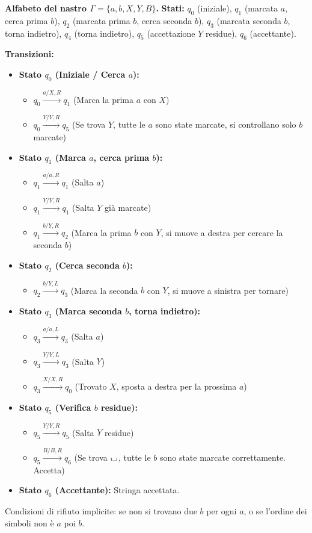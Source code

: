 \documentclass[a4paper]{article}
\theoremstyle{definition} %
\newcommand{\blankS}{\ensuremath{\raisebox{-0.15ex}{\scalebox{1.3}[0.7]{$\sqcup$}}}}
\begin{document}
\noindent \textbf{Alfabeto del nastro $\Gamma = \{a, b, X, Y, B\}$.}
\noindent \textbf{Stati:} $q_0$ (iniziale), $q_1$ (marcata $a$, cerca prima $b$), $q_2$ (marcata prima $b$, cerca seconda $b$), $q_3$ (marcata seconda $b$, torna indietro), $q_4$ (torna indietro), $q_5$ (accettazione $Y$ residue), $q_6$ (accettante).

\noindent \textbf{Transizioni:}
\begin{itemize}
    \item \textbf{Stato $q_0$ (Iniziale / Cerca $a$):}
        \begin{itemize}
            \item $q_0 \xrightarrow{a / X, R} q_1$ (Marca la prima $a$ con $X$)
            \item $q_0 \xrightarrow{Y / Y, R} q_5$ (Se trova $Y$, tutte le $a$ sono state marcate, si controllano solo $b$ marcate)
        \end{itemize}
    \item \textbf{Stato $q_1$ (Marca $a$, cerca prima $b$):}
        \begin{itemize}
            \item $q_1 \xrightarrow{a / a, R} q_1$ (Salta $a$)
            \item $q_1 \xrightarrow{Y / Y, R} q_1$ (Salta $Y$ già marcate)
            \item $q_1 \xrightarrow{b / Y, R} q_2$ (Marca la prima $b$ con $Y$, si muove a destra per cercare la seconda $b$)
        \end{itemize}
    \item \textbf{Stato $q_2$ (Cerca seconda $b$):}
        \begin{itemize}
            \item $q_2 \xrightarrow{b / Y, L} q_3$ (Marca la seconda $b$ con $Y$, si muove a sinistra per tornare)
        \end{itemize}
    \item \textbf{Stato $q_3$ (Marca seconda $b$, torna indietro):}
        \begin{itemize}
            \item $q_3 \xrightarrow{a / a, L} q_3$ (Salta $a$)
            \item $q_3 \xrightarrow{Y / Y, L} q_3$ (Salta $Y$)
            \item $q_3 \xrightarrow{X / X, R} q_0$ (Trovato $X$, sposta a destra per la prossima $a$)
        \end{itemize}
    \item \textbf{Stato $q_5$ (Verifica $b$ residue):}
        \begin{itemize}
            \item $q_5 \xrightarrow{Y / Y, R} q_5$ (Salta $Y$ residue)
            \item $q_5 \xrightarrow{B / B, R} q_6$ (Se trova \blankS, tutte le $b$ sono state marcate correttamente. Accetta)
        \end{itemize}
    \item \textbf{Stato $q_6$ (Accettante):} Stringa accettata.
\end{itemize}
Condizioni di rifiuto implicite: se non si trovano due $b$ per ogni $a$, o se l'ordine dei simboli non è $a$ poi $b$.
\end{document}
